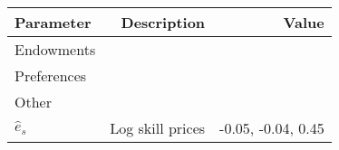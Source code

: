 \begin{tabular}{lrr}
\hline
Parameter & Description  & Value  \\
\hline
Endowments &   &   \\
Preferences &   &   \\
Other &   &   \\
$\hat{e}_{s}$ & Log skill prices  & -0.05, -0.04, 0.45  \\
\hline
\end{tabular}%
